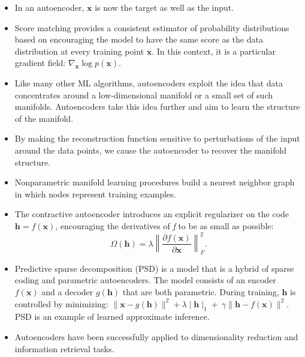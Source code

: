 \documentclass{article}
\begin{document}
\begin{itemize}
\item In an autoencoder, \(\boldsymbol{x}\) is now the target as well as the input.
\item Score matching provides a consistent estimator of probability distributions based on encouraging the model to have the same score as the data distribution at every training point \(\boldsymbol{x}\). In this context, it is a particular gradient field: \(\nabla_{\boldsymbol{x}}\log p(\boldsymbol{x})\).
\item Like many other ML algorithms, autoencoders exploit the idea that data concentrates around a low-dimensional manifold or a small set of such manifolds. Autoencoders take this idea further and aim to learn the structure of the manifold.
\item By making the reconstruction function sensitive to perturbations of the input around the data points, we cause the autoencoder to recover the manifold structure.
\item Nonparametric manifold learning procedures build a nearest neighbor graph in which nodes represent training examples.
\item The contractive autoencoder introduces an explicit regularizer on the code \(\boldsymbol{h} = f(\boldsymbol{x})\), encouraging the derivatives of \textit{f} to be as small as possible:
\[
	\Omega(\boldsymbol{h}) = \lambda \left\|\frac{\partial f(\boldsymbol{x})}{\partial \boldsymbol{x}}\right\|^2_{F}.
\]
\item Predictive sparse decomposition (PSD) is a model that is a hybrid of sparse coding and parametric autoencoders. The model consists of an encoder \(f(\boldsymbol{x})\) and a decoder \(g(\boldsymbol{h})\) that are both parametric. During training, \(\boldsymbol{h}\) is controlled by minimizing: \(\|\boldsymbol{x}-g(\boldsymbol{h})\|^2 + \lambda\mid \boldsymbol{h}\mid_1 + \ \gamma\|\boldsymbol{h}-f(\boldsymbol{x})\|^2\).\\PSD is an example of learned approximate inference.
\item Autoencoders have been successfully applied to dimensionality reduction and information retrieval tasks.
\end{itemize}
\end{document}
